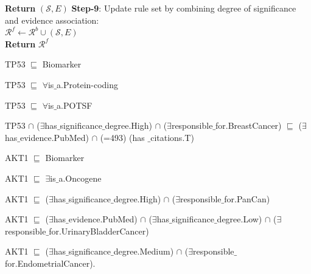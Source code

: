 \begin{algorithm*}[h]
{{{            \textbf{Return} $(\mathcal{S}, {E})$
            }
            \textbf{Step-9}: Update rule set by combining degree of significance and evidence association: \\
            $\mathcal{R}^{f} \leftarrow \mathcal{R}^{b} \cup (\mathcal{S}, {E})$\\
            \textbf{Return} $\mathcal{R}^{f}$
     }}
     \label{algo:fair_dr}
\end{algorithm*}

\begin{itemize}[noitemsep]
\scriptsize{
    \item TP53 $ \sqsubseteq  $ Biomarker
    \item TP53 $ \sqsubseteq  $ $  \forall $is$ {\_}$a.Protein-coding
    \item TP53 $ \sqsubseteq  $ $  \forall $is$ {\_}$a.POTSF
    \item TP53 $  \cap $ ($\exists$has$ {\_}$significance$ {\_}$degree.High) $  \cap $ ($\exists$responsible$ {\_}$for.BreastCancer) $ \sqsubseteq  $ ($\exists$has$ {\_}$evidence.PubMed) $\cap$ (=493) (has ${\_}$citations.T)}
\end{itemize}

\begin{itemize}[noitemsep]
\scriptsize{
    \item AKT1 $ \sqsubseteq  $ Biomarker
    \item AKT1 $ \sqsubseteq  $ $\exists$is$ {\_}$a.Oncogene
    \item AKT1 $ \sqsubseteq  $ ($\exists$has$ {\_}$significance$ {\_}$degree.High) $  \cap $ ($\exists$responsible$ {\_}$for.PanCan)
    \item AKT1 $ \sqsubseteq  $ ($\exists$has$ {\_}$evidence.PubMed) $  \cap $ ($\exists$has$ {\_}$significance$ {\_}$degree.Low) $  \cap $ ($\exists$responsible$ {\_}$for.UrinaryBladderCancer)
    \item AKT1 $ \sqsubseteq  $ ($\exists$has$ {\_}$significance$ {\_}$degree.Medium) $  \cap $ ($\exists$responsible$ {\_}$for.EndometrialCancer).}
\end{itemize}

